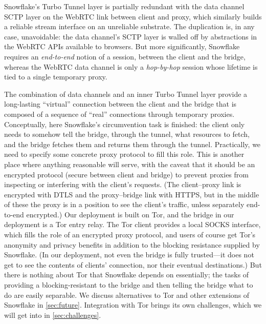 \documentclass[letterpaper,twocolumn]{article}
\begin{document}
Snowflake's Turbo Tunnel layer
is partially redundant with the data channel SCTP layer
on the WebRTC link between client and proxy,
which similarly builds a reliable stream interface
on an unreliable substrate.
The duplication is, in any case, unavoidable:
the data channel's SCTP layer is walled off by abstractions
in the WebRTC APIs available to browsers.
But more significantly, Snowflake requires an
\emph{end-to-end} notion of a session,
between the client and the bridge,
whereas the WebRTC data channel is only a
\emph{hop-by-hop} session
whose lifetime is tied to a single temporary proxy.

The combination of data channels and an inner Turbo Tunnel layer
provide a long-lasting ``virtual'' connection between the client and the bridge
that is composed of a sequence of ``real'' connections through temporary proxies.
Conceptually, here Snowflake's circumvention task is finished:
the client only needs to somehow tell the bridge, through the tunnel,
what resources to fetch, and the bridge fetches them and returns them through the tunnel.
Practically, we need to specify some concrete proxy protocol to fill this role.
This is another place where anything reasonable will serve,
with the caveat that it should be an encrypted protocol
(secure between client and bridge) to prevent proxies
from inspecting or interfering with the client's requests.
(The client--proxy link is encrypted with DTLS
and the proxy--bridge link with HTTPS,
but in the middle of these the proxy is in a position to see
the client's traffic, unless separately end-to-end encrypted.)
Our deployment is built on Tor,
and the bridge in our deployment is a Tor entry relay.
The Tor client provides a local SOCKS interface,
which fills the role of an encrypted proxy protocol,
and users of course get Tor's anonymity and privacy benefits
in addition to the blocking resistance supplied by Snowflake.
(In our deployment, not even the bridge is fully trusted---it
does not get to see the contents of clients' connection,
nor their eventual destinations.)
But there is nothing about Tor that Snowflake depends on essentially;
the tasks of providing a blocking-resistant to the bridge
and then telling the bridge what to do are easily separable.
We discuss alternatives to Tor
and other extensions of Snowflake in \autoref{sec:future}.
Integration with Tor brings its own challenges,
which we will get into in \autoref{sec:challenges}.
\end{document}
